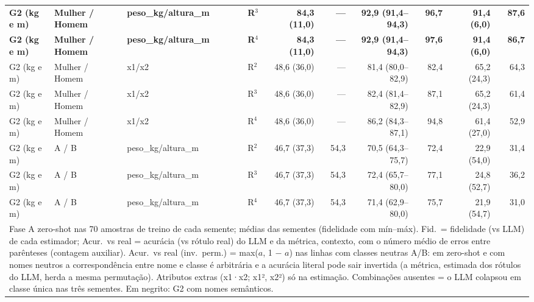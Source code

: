 \begin{table}[htbp]
\begin{tabular}{llllrrrrrr}
\textbf{G2 (kg e m)} & \textbf{Mulher / Homem} & \textbf{peso\_kg/altura\_m} & \textbf{R$^3$} & \textbf{84,3 (11,0)} & \textbf{—} & \textbf{92,9 (91,4–94,3)} & \textbf{96,7} & \textbf{91,4 (6,0)} & \textbf{87,6} \\
\textbf{G2 (kg e m)} & \textbf{Mulher / Homem} & \textbf{peso\_kg/altura\_m} & \textbf{R$^4$} & \textbf{84,3 (11,0)} & \textbf{—} & \textbf{92,9 (91,4–94,3)} & \textbf{97,6} & \textbf{91,4 (6,0)} & \textbf{86,7} \\
\midrule
G2 (kg e m) & Mulher / Homem & x1/x2 & R$^2$ & 48,6 (36,0) & — & 81,4 (80,0–82,9) & 82,4 & 65,2 (24,3) & 64,3 \\
G2 (kg e m) & Mulher / Homem & x1/x2 & R$^3$ & 48,6 (36,0) & — & 82,4 (81,4–82,9) & 87,1 & 65,2 (24,3) & 61,4 \\
G2 (kg e m) & Mulher / Homem & x1/x2 & R$^4$ & 48,6 (36,0) & — & 86,2 (84,3–87,1) & 94,8 & 61,4 (27,0) & 52,9 \\
\midrule
G2 (kg e m) & A / B & peso\_kg/altura\_m & R$^2$ & 46,7 (37,3) & 54,3 & 70,5 (64,3–75,7) & 72,4 & 22,9 (54,0) & 31,4 \\
G2 (kg e m) & A / B & peso\_kg/altura\_m & R$^3$ & 46,7 (37,3) & 54,3 & 72,4 (65,7–80,0) & 77,1 & 24,8 (52,7) & 36,2 \\
G2 (kg e m) & A / B & peso\_kg/altura\_m & R$^4$ & 46,7 (37,3) & 54,3 & 71,4 (62,9–80,0) & 75,7 & 21,9 (54,7) & 31,0 \\
\bottomrule
\multicolumn{10}{p{0.95\linewidth}}{\footnotesize Fase A zero-shot nas 70 amostras de treino de cada semente; médias das sementes (fidelidade com mín–máx). Fid.\ = fidelidade (vs LLM) de cada estimador; Acur.\ vs real = acurácia (vs rótulo real) do LLM e da métrica, contexto, com o número médio de erros entre parênteses (contagem auxiliar). Acur.\ vs real (inv.\ perm.) = max($a$, 1 $-$ $a$) nas linhas com classes neutras A/B: em zero-shot e com nomes neutros a correspondência entre nome e classe é arbitrária e a acurácia literal pode sair invertida (a métrica, estimada dos rótulos do LLM, herda a mesma permutação). Atributos extras (x1·x2; x1², x2²) só na estimação. Combinações ausentes = o LLM colapsou em classe única nas três sementes. Em negrito: G2 com nomes semânticos.} \\
\end{tabular}
\end{table}
